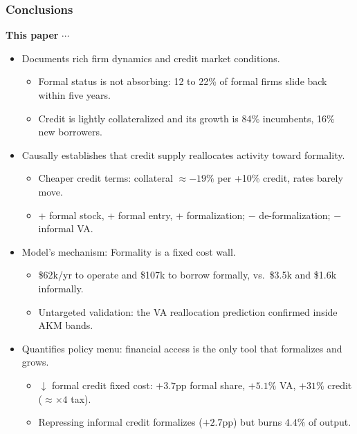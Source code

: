 \documentclass[aspectratio=169]{beamer}
\begin{document}
\begin{frame}
\frametitle{\textbf{Conclusions}} \label{conclusion}
 
\textbf{This paper} $\cdots$
 
\vspace{3mm}
 
\begin{itemize}
    \item Documents rich firm dynamics and credit market conditions.
    \begin{itemize}
        \item Formal status is not absorbing: 12 to 22\% of formal firms slide back within five years.
        \item Credit is lightly collateralized and its growth is 84\% incumbents, 16\% new borrowers.
    \end{itemize}
    \vspace{2mm}
    \item Causally establishes that credit supply reallocates activity toward formality.
    \begin{itemize}
        \item Cheaper credit terms: collateral $\approx -19\%$ per +10\% credit, rates barely move.
        \item + formal stock, + formal entry, + formalization; $-$ de-formalization; $-$ informal VA.
    \end{itemize}
    \vspace{2mm}
    \item Model's mechanism: Formality is a fixed cost wall.
    \begin{itemize}
        \item \$62k/yr to operate and \$107k to borrow formally, vs.\ \$3.5k and \$1.6k informally.
        \item Untargeted validation: the VA reallocation prediction confirmed inside AKM bands.
    \end{itemize}
    \vspace{2mm}
    \item Quantifies policy menu: financial access is the only tool that formalizes and grows.
    \begin{itemize}
        \item $\downarrow$ formal credit fixed cost: $+3.7$pp formal share, $+5.1\%$ VA, $+31\%$ credit ($\approx \times 4$ tax).
        \item Repressing informal credit formalizes ($+2.7$pp) but burns $4.4\%$ of output.
    \end{itemize}
\end{itemize}
 
\end{frame}
 
\end{document}

